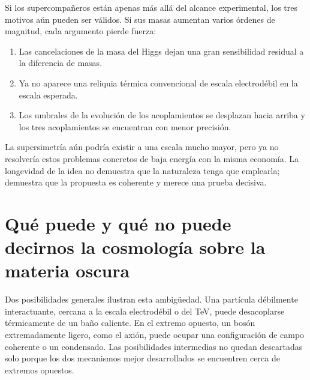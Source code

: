 Si los supercompañeros están apenas más allá del alcance experimental, los tres motivos aún pueden ser válidos. Si sus masas aumentan varios órdenes de magnitud, cada argumento pierde fuerza:
\begin{enumerate}\item Las cancelaciones de la masa del Higgs dejan una gran sensibilidad residual a la diferencia de masas.
\item Ya no aparece una reliquia térmica convencional de escala electrodébil en la escala esperada.
\item Los umbrales de la evolución de los acoplamientos se desplazan hacia arriba y los tres acoplamientos se encuentran con menor precisión.
\end{enumerate}
La supersimetría aún podría existir a una escala mucho mayor, pero ya no resolvería estos problemas concretos de baja energía con la misma economía. La longevidad de la idea no demuestra que la naturaleza tenga que emplearla; demuestra que la propuesta es coherente y merece una prueba decisiva.

\section{Qué puede y qué no puede decirnos la cosmología sobre la materia oscura}

\begin{classroomqa}
\end{classroomqa}

Dos posibilidades generales ilustran esta ambigüedad. Una partícula débilmente interactuante, cercana a la escala electrodébil o del TeV, puede desacoplarse térmicamente de un baño caliente. En el extremo opuesto, un bosón extremadamente ligero, como el axión, puede ocupar una configuración de campo coherente o un condensado. Las posibilidades intermedias no quedan descartadas solo porque los dos mecanismos mejor desarrollados se encuentren cerca de extremos opuestos.

